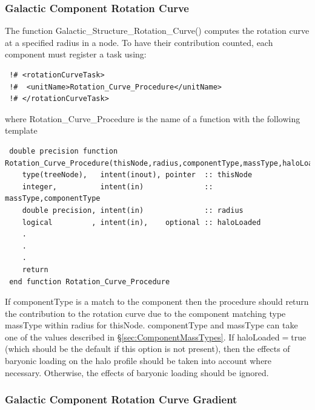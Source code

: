 \subsubsection{Galactic Component Rotation Curve}

The function {\normalfont \ttfamily Galactic\_Structure\_Rotation\_Curve()} computes the rotation curve at a specified radius in a node. To have their contribution counted, each component must register a task using:
\begin{verbatim}
 !# <rotationCurveTask>
 !#  <unitName>Rotation_Curve_Procedure</unitName>
 !# </rotationCurveTask>
\end{verbatim}
where {\normalfont \ttfamily Rotation\_Curve\_Procedure} is the name of a function with the following template
\begin{verbatim}
 double precision function Rotation_Curve_Procedure(thisNode,radius,componentType,massType,haloLoaded)
    type(treeNode),   intent(inout), pointer  :: thisNode
    integer,          intent(in)              :: massType,componentType
    double precision, intent(in)              :: radius
    logical         , intent(in),    optional :: haloLoaded
    .
    .
    .
    return
 end function Rotation_Curve_Procedure
\end{verbatim}
If {\normalfont \ttfamily componentType} is a match to the component then the procedure should return the contribution to the rotation curve due to the component matching type {\normalfont \ttfamily massType} within {\normalfont \ttfamily radius} for {\normalfont \ttfamily thisNode}. {\normalfont \ttfamily componentType} and {\normalfont \ttfamily massType} can take one of the values described in \S\ref{sec:ComponentMassTypes}. If {\normalfont \ttfamily haloLoaded}$=${\normalfont \ttfamily true} (which should be the default if this option is not present), then the effects of baryonic loading on the halo profile should be taken into account where necessary. Otherwise, the effects of baryonic loading should be ignored.

\subsubsection{Galactic Component Rotation Curve Gradient}

